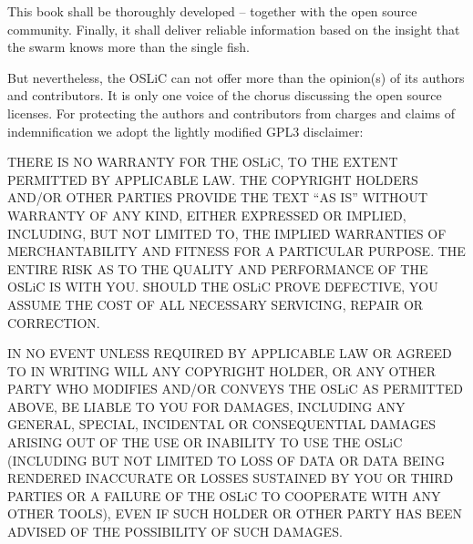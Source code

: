 %
%
%
%

%


This book shall be thoroughly developed -- together with the open source
community. Finally, it shall deliver reliable information based on the insight
that the swarm knows more than the single fish.

But nevertheless, the OSLiC can not offer more than the opinion(s) of its authors
and contributors. It is only one voice of the chorus discussing the open source
licenses. For protecting the authors and contributors from charges and claims of
indemnification we adopt the lightly modified GPL3 disclaimer:

THERE IS NO WARRANTY FOR THE OSLiC, TO THE EXTENT PERMITTED BY APPLICABLE LAW.
THE COPYRIGHT HOLDERS AND/OR OTHER PARTIES PROVIDE THE TEXT “AS IS” WITHOUT
WARRANTY OF ANY KIND, EITHER EXPRESSED OR IMPLIED, INCLUDING, BUT NOT LIMITED
TO, THE IMPLIED WARRANTIES OF MERCHANTABILITY AND FITNESS FOR A PARTICULAR
PURPOSE. THE ENTIRE RISK AS TO THE QUALITY AND PERFORMANCE OF THE OSLiC IS
WITH YOU. SHOULD THE OSLiC PROVE DEFECTIVE, YOU ASSUME THE COST OF ALL
NECESSARY SERVICING, REPAIR OR CORRECTION.

IN NO EVENT UNLESS REQUIRED BY APPLICABLE LAW OR AGREED TO IN WRITING WILL ANY
COPYRIGHT HOLDER, OR ANY OTHER PARTY WHO MODIFIES AND/OR CONVEYS THE OSLiC AS
PERMITTED ABOVE, BE LIABLE TO YOU FOR DAMAGES, INCLUDING ANY GENERAL, SPECIAL,
INCIDENTAL OR CONSEQUENTIAL DAMAGES ARISING OUT OF THE USE OR INABILITY TO USE
THE OSLiC (INCLUDING BUT NOT LIMITED TO LOSS OF DATA OR DATA BEING RENDERED
INACCURATE OR LOSSES SUSTAINED BY YOU OR THIRD PARTIES OR A FAILURE OF THE
OSLiC TO COOPERATE WITH ANY OTHER TOOLS), EVEN IF SUCH HOLDER OR OTHER PARTY
HAS BEEN ADVISED OF THE POSSIBILITY OF SUCH DAMAGES.

